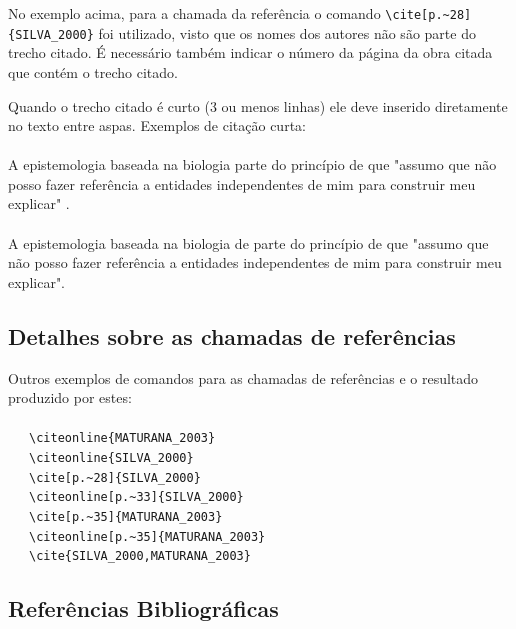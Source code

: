 No exemplo acima, para a chamada da referência o comando \verb|\cite[p.~28]{SILVA_2000}| foi utilizado, visto que os nomes dos autores não são parte do trecho citado. É necessário também indicar o número da página da obra citada que contém o trecho citado.

Quando o trecho citado é curto (3 ou menos linhas) ele deve inserido diretamente no texto entre aspas. Exemplos de citação curta: \\
\\A epistemologia baseada na biologia parte do princípio de que "assumo que não posso fazer referência a entidades independentes de mim para construir meu explicar" \cite[p.~35]{MATURANA_2003}. \\
\\A epistemologia baseada na biologia de  parte do princípio de que "assumo que não posso fazer referência a entidades independentes de mim para construir meu explicar".

\subsection{Detalhes sobre as chamadas de referências}
\label{subsec:chamadas_referencias}

Outros exemplos de comandos para as chamadas de referências e o resultado produzido por estes: \\
\\ \ \ \  \verb|\citeonline{MATURANA_2003}|\\
 \ \ \   \verb|\citeonline{SILVA_2000}|\\
\cite[p.~28]{SILVA_2000} \ \ \  \verb|\cite[p.~28]{SILVA_2000}|\\
 \ \ \   \verb|\citeonline[p.~33]{SILVA_2000}|\\
\cite[p.~35]{MATURANA_2003} \ \ \   \verb|\cite[p.~35]{MATURANA_2003}|\\
 \ \ \   \verb|\citeonline[p.~35]{MATURANA_2003}|\\
\cite{SILVA_2000,MATURANA_2003} \ \ \   \verb|\cite{SILVA_2000,MATURANA_2003}|\\

\subsection{Referências Bibliográficas}
\label{subsec:referencias_bibliograficas}

